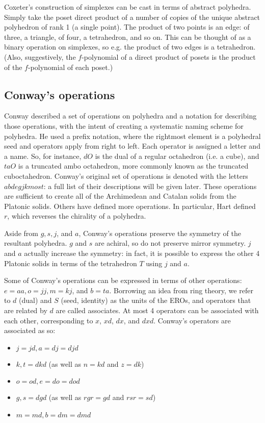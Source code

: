 \documentclass{article}
\begin{document}
Coxeter's construction of simplexes can be cast in terms of abstract polyhedra.
Simply take the poset direct product of a number of copies of the unique
abstract polyhedron of rank 1 (a single point). The product of two points is an
edge: of three, a triangle, of four, a tetrahedron, and so on. This can be
thought of as a binary operation on simplexes, so e.g. the product of two edges
is a tetrahedron. (Also, suggestively, the $f$-polynomial of a direct product
of posets is the product of the $f$-polynomial of each poset.)

\subsection{Conway's operations}
Conway described a set of operations on polyhedra and a notation for describing
those operations, with the intent of creating a systematic naming scheme for
polyhedra. He used a prefix notation, where the rightmost element is a
polyhedral seed and operators apply from right to left. Each operator is
assigned a letter and a name. So, for instance, $dO$ is the dual of a regular
octahedron (i.e. a cube), and $taO$ is a truncated ambo octahedron, more
commonly known as the truncated cuboctahedron. Conway's original set of
operations is denoted with the letters $abdegjkmost$: a full list of their
descriptions will be given later. These operations are sufficient to create all
of the Archimedean and Catalan solids from the Platonic solids. Others have
defined more operations. \cite{HartConway}\cite{HartPropeller}\cite{antiprism}
In particular, Hart \cite{HartConway} defined $r$,
which reverses the chirality of a polyhedra.

Aside from $g, s, j$, and $a$, Conway's operations preserve the
symmetry of the resultant polyhedra. $g$ and $s$ are achiral, so
do not preserve mirror symmetry. $j$ and $a$ actually increase
the symmetry: in fact, it is possible to express the other 4 Platonic solids
in terms of the tetrahedron $T$ using $j$ and $a$.

Some of Conway's operations can be expressed in terms of other operations:
$e=aa, o=jj, m=kj$, and $b=ta$. Borrowing an idea from ring
theory, we refer to $d$ (dual) and $S$ (seed, identity) as the
units of the EROs, and operators that are related by $d$ are called
associates. At most 4 operators can be associated with each other, corresponding
to $x$, $xd$, $dx$, and $dxd$.
Conway's operators are associated as so:

\begin{itemize}
  \item $j=jd, a=dj=djd$
  \item $k, t=dkd$ (as well as $n=kd$ and $z=dk$)
  \item $o=od, e=do=dod$
  \item $g, s=dgd$ (as well as $rgr=gd$ and $rsr=sd$)
  \item $m=md, b=dm=dmd$
\end{itemize}
\end{document}
